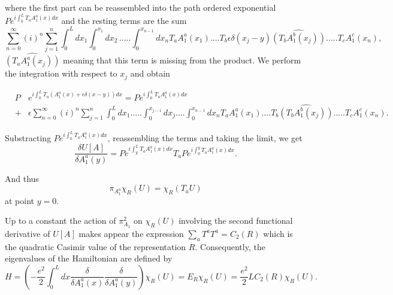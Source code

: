 \documentclass[11pt]{report}
\theoremstyle{plain}
\theoremstyle{definition}
\theoremstyle{remark}
\theoremstyle{remark}
\numberwithin{equation}{section}
\begin{document}
where the first part can be reassembled into the path ordered exponential $P e^{i\int_0^L T_aA^a_1(x)dx}$ and the resting terms are the sum
%
$$
\sum_{n=0}^{\infty} (i)^n\sum_{j=1}^n \int_0^L dx_1 \int_0^{x_1} dx_2 \, ..... \int_0^{x_{n-1}} dx_n T_aA^a_1(x_1)....T_b\epsilon \delta (x_j - y) \widehat{(T_bA^b_1(x_j))}.....T_cA^c_1(x_n),
$$
$\widehat{(T_aA^a_1(x_j))}$ meaning that this term is missing from the product. We perform the integration with respect to $x_j$ and obtain
%
\begin{spacing}{1.45}
$
\begin{array}{lll}
&P& e^{i\int_0^L T_a(A^a_1(x) + \epsilon \delta(x-y))dx} = P e^{i\int_0^L T_aA^a_1(x)dx} \\
&+& \epsilon  \sum_{n=0}^{\infty} (i)^n \sum_{j=1}^n \int_0^L dx_1 .....\widehat{\int_0^{x_{j-1}} dx_j}.... \int_0^{x_{n-1}} dx_n T_aA^a_1(x_1)....T_b\widehat{(T_bA^b_1(x_j))}.....T_cA^c_1(x_n).
\end{array}
$
\end{spacing}

%


Substracting $P e^{i\int_0^L T_aA^a_1(x) dx}$, reassembling the terms and taking the limit, we get
$$ \frac{\delta U[A]}{\delta A^a_1(y)} = P e^{i\int_y^L T_aA^a_1(x) dx} T_a  P e^{i\int_0^y T_aA^a_1(x) dx}.$$ 
%

And thus $$\pi_{A^a_1} \chi_R(U) = \chi_R(T_a U)$$ at point $y=0$.

Up to a constant the action of $\pi_{A_1}^2$ on $\chi_R(U)$ involving the second functional derivative of $U[A]$ makes appear the expression $\sum_a T^aT^a = C_2(R)$ which is the quadratic Casimir value of the representation $R$. 
Consequently, the eigenvalues of the Hamiltonian are defined by
%
$$
H = (-\frac{e^2}{2} \int^L_0 dx \frac{\delta}{\delta A^a_1(x)}\frac{\delta}{\delta A^a_1(y)}) \chi_R(U) = E_R \chi_R(U) = \frac{e^2}{2}LC_2(R)\chi_R(U).
$$
\end{document}
